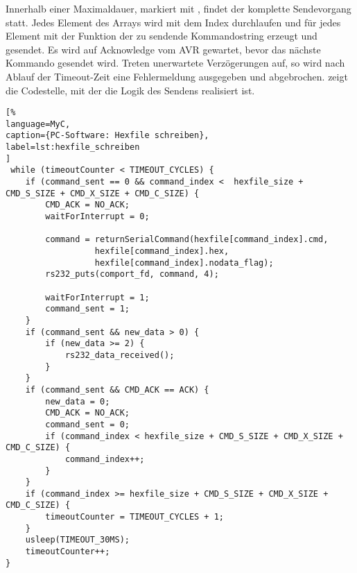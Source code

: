 Innerhalb einer Maximaldauer, markiert mit , findet der komplette Sendevorgang statt. Jedes Element des Arrays  wird mit dem Index  durchlaufen und für jedes Element mit der Funktion  der zu sendende Kommandostring erzeugt und gesendet. Es wird auf Acknowledge vom AVR gewartet, bevor das nächste Kommando gesendet wird. Treten unerwartete Verzögerungen auf, so wird nach Ablauf der Timeout-Zeit eine Fehlermeldung ausgegeben und abgebrochen.  zeigt die Codestelle, mit der die Logik des Sendens realisiert ist. 
\begin{lstlisting}[%
language=MyC,
caption={PC-Software: Hexfile schreiben},
label=lst:hexfile_schreiben
]
 while (timeoutCounter < TIMEOUT_CYCLES) {
    if (command_sent == 0 && command_index <  hexfile_size + CMD_S_SIZE + CMD_X_SIZE + CMD_C_SIZE) {
        CMD_ACK = NO_ACK;
        waitForInterrupt = 0;

        command = returnSerialCommand(hexfile[command_index].cmd,
                  hexfile[command_index].hex,
                  hexfile[command_index].nodata_flag);
        rs232_puts(comport_fd, command, 4);

        waitForInterrupt = 1;
        command_sent = 1;
    }
    if (command_sent && new_data > 0) {
        if (new_data >= 2) {
            rs232_data_received();
        }
    }
    if (command_sent && CMD_ACK == ACK) {
        new_data = 0;
        CMD_ACK = NO_ACK;
        command_sent = 0;
        if (command_index < hexfile_size + CMD_S_SIZE + CMD_X_SIZE + CMD_C_SIZE) {
            command_index++;
        }
    }
    if (command_index >= hexfile_size + CMD_S_SIZE + CMD_X_SIZE + CMD_C_SIZE) {
        timeoutCounter = TIMEOUT_CYCLES + 1;
    }
    usleep(TIMEOUT_30MS);
    timeoutCounter++;
}
\end{lstlisting}%
\newpage

